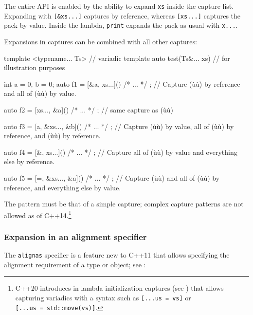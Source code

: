 \noindent The entire API is enabled by the ability to expand \lstinline!xs! inside
the capture list. Expanding with \lstinline![&xs...]! captures by
reference, whereas \lstinline![xs...]! captures the pack by value. Inside
the lambda, \lstinline!print! expands the pack as usual with \lstinline!x...!.

Expansions in captures can be combined with all other captures:

\begin{emcppslisting}
template <typename... Ts>    // variadic template
auto test(Ts&... xs)         // for illustration purposes
{
    int a = 0, b = 0;
    auto f1 = [&a, xs...]() { /* ... */ };
        // Capture (ù{}ù) by reference and all of (ù{}ù) by value.

    auto f2 = [xs..., &a]() { /* ... */ };
        // same capture as (ù{}ù)

    auto f3 = [a, &xs..., &b]() { /* ... */ };
        // Capture (ù{}ù) by value, all of (ù{}ù) by reference, and (ù{}ù) by reference.

    auto f4 = [&, xs...]() { /* ... */ };
        // Capture all of (ù{}ù) by value and everything else by reference.

    auto f5 = [=, &xs..., &a]() { /* ... */ };
        // Capture (ù{}ù) and all of (ù{}ù) by reference, and everything else by value.
}
\end{emcppslisting}
    

\noindent The pattern must be that of a simple capture; complex capture patterns
are not allowed as of C++14.{\cprotect\footnote{C++20 introduces
 in lambda initialization captures (see \cite{revzin18}) that allows capturing variadics with a syntax such as
\lstinline![...us!~\lstinline!=!~\lstinline!vs]! or
  \lstinline![...us!~\lstinline!=!~\lstinline!std::move(vs)]!.}}

\subsubsection[Expansion in an alignment specifier]{Expansion in an alignment specifier}\label{expansion-in-an-alignment-specifier}

The \lstinline!alignas! specifier is a feature new to C++11 that allows
specifying the alignment requirement of a type or object; see
:

